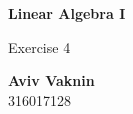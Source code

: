 \documentclass[a4paper, 12pt]{article}
\begin{document}
    \begin{center}
        \vspace*{4.4cm}
            
        \Huge
        \textbf{Linear Algebra I}
            
        \vspace{0.5cm}
        \LARGE
        Exercise 4

        \vfill
            
        \Large
        \textbf{Aviv Vaknin}\\316017128
                    
    \end{center}
\end{document}
